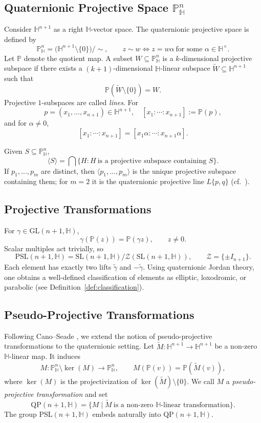 \documentclass[12pt,reqno]{amsart}
\numberwithin{equation}{section}
\theoremstyle{definition}
\begin{document}
\subsection*{Quaternionic Projective Space $\mathbb{P}^n_{\mathbb{H}}$}

Consider $\mathbb{H}^{n+1}$ as a right $\mathbb{H}$-vector space. The quaternionic projective space is defined by
\[
\mathbb{P}^n_{\mathbb{H}} = \big( \mathbb{H}^{n+1}\setminus\{0\} \big) / \sim,
\qquad
z \sim w \iff z = w \alpha \ \text{for some }\alpha \in \mathbb{H}^\times.
\]
Let $\mathbb{P}$ denote the quotient map. A subset $W\subseteq \mathbb{P}^n_{\mathbb{H}}$ is a $k$-dimensional projective subspace if there exists a $(k+1)$-dimensional $\mathbb{H}$-linear subspace $\widetilde{W}\subseteq \mathbb{H}^{n+1}$ such that
\[
\mathbb{P}(\widetilde{W}\setminus\{0\}) = W.
\]
Projective $1$-subspaces are called \emph{lines}. For
\[
p=(x_1,\dots,x_{n+1}) \in \mathbb{H}^{n+1},
\quad
[x_1:\cdots:x_{n+1}] := \mathbb{P}(p),
\]
and for $\alpha \neq 0$,
\[
[x_1:\cdots:x_{n+1}] = [x_1\alpha : \cdots : x_{n+1}\alpha].
\]

Given $S \subseteq \mathbb{P}^n_{\mathbb{H}}$,
\[
\langle S\rangle = \bigcap \{ H : H \ \text{is a projective subspace containing } S\}.
\]
If $p_1,\dots,p_m$ are distinct, then $\langle p_1,\dots,p_m\rangle$ is the unique projective subspace containing them; for $m=2$ it is the quaternionic projective line $L\{p,q\}$ (cf.~\cite{dgl}).

\subsection*{Projective Transformations}

For $\gamma \in \mathrm{GL}(n+1,\mathbb{H})$,
\[
\gamma(\mathbb{P}(z)) = \mathbb{P}(\gamma z), \qquad z\neq 0.
\]
Scalar multiples act trivially, so
\[
\mathrm{PSL}(n+1,\mathbb{H})
= \mathrm{SL}(n+1,\mathbb{H}) / \mathcal{Z}(\mathrm{SL}(n+1,\mathbb{H})),
\qquad
\mathcal{Z} = \{\pm I_{n+1}\}.
\]
Each element has exactly two lifts $\widetilde{\gamma}$ and $-\widetilde{\gamma}$. Using quaternionic Jordan theory, one obtains a well-defined classification of elements as elliptic, loxodromic, or parabolic (see Definition~\ref{def:classification}).

\subsection*{Pseudo-Projective Transformations}

Following Cano--Seade \cite{can2}, we extend the notion of pseudo-projective transformations to the quaternionic setting. Let $\widetilde{M}:\mathbb{H}^{n+1}\to\mathbb{H}^{n+1}$ be a non-zero $\mathbb{H}$-linear map. It induces
\[
M : \mathbb{P}^n_{\mathbb{H}} \setminus \ker(M) \longrightarrow \mathbb{P}^n_{\mathbb{H}},
\qquad
M(\mathbb{P}(v)) = \mathbb{P}(\widetilde{M}(v)),
\]
where $\ker(M)$ is the projectivization of $\ker(\widetilde{M})\setminus\{0\}$. We call $M$ a \emph{pseudo-projective transformation} and set
\[
\mathrm{QP}(n+1,\mathbb{H})
= \{ M \mid \widetilde{M} \ \text{is a non-zero }\mathbb{H}\text{-linear transformation}\}.
\]
The group $\mathrm{PSL}(n+1,\mathbb{H})$ embeds naturally into $\mathrm{QP}(n+1,\mathbb{H})$.
\end{document}
